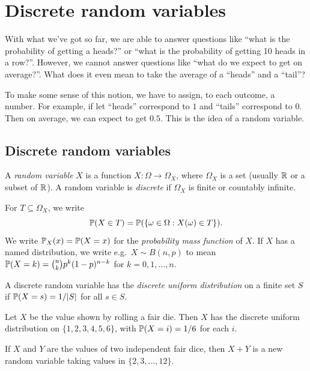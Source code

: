 \documentclass[a4paper]{article}
\begin{document}
\section{Discrete random variables}
With what we've got so far, we are able to answer questions like ``what is the probability of getting a heads?'' or ``what is the probability of getting 10 heads in a row?''. However, we cannot answer questions like ``what do we expect to get on average?''. What does it even mean to take the average of a ``heads'' and a ``tail''?

To make some sense of this notion, we have to assign, to each outcome, a number. For example, if let ``heads'' correspond to $1$ and ``tails'' correspond to $0$. Then on average, we can expect to get $0.5$. This is the idea of a random variable.

\subsection{Discrete random variables}

\begin{defi}
  A \emph{random variable} $X$ is a function $X\colon \Omega \to \Omega_X$, where $\Omega_X$ is a set (usually $\R$ or a subset of $\R$). A random variable is \emph{discrete} if $\Omega_X$ is finite or countably infinite.
\end{defi}

\begin{notation}
  For $T\subseteq \Omega_X$, we write
  \[
    \P(X\in T) = \P(\{\omega \in \Omega: X(\omega) \in T\}).
  \]
  We write $\P_X(x) = \P(X = x)$ for the \emph{probability mass function} of $X$. If $X$ has a named distribution, we write e.g.\ $X\sim B(n, p)$ to mean $\P(X = k) = \binom{n}{k}p^k(1 - p)^{n - k}$ for $k = 0, 1, \dotsc, n$.
\end{notation}

\begin{defi}
  A discrete random variable has the \emph{discrete uniform distribution} on a finite set $S$ if $\P(X = s) = 1/|S|$ for all $s \in S$.
\end{defi}

\begin{eg}
  Let $X$ be the value shown by rolling a fair die. Then $X$ has the discrete uniform distribution on $\{1, 2, 3, 4, 5, 6\}$, with $\P(X = i) = 1/6$ for each $i$.
\end{eg}

\begin{eg}
  If $X$ and $Y$ are the values of two independent fair dice, then $X + Y$ is a new random variable taking values in $\{2, 3, \dotsc, 12\}$.
\end{eg}
\end{document}
